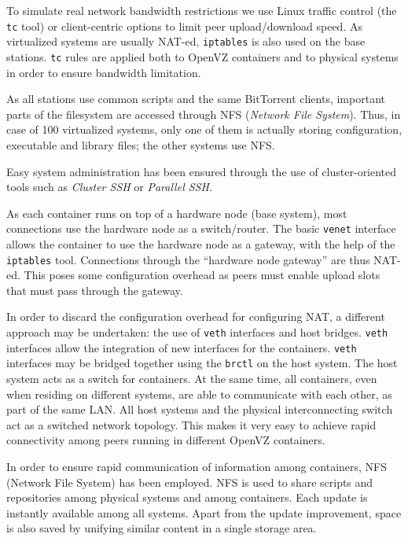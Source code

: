 To simulate real network bandwidth restrictions we use Linux traffic control
(the \texttt{tc} tool) or client-centric options to limit peer upload/download
speed. As virtualized systems are usually NAT-ed, \texttt{iptables} is also
used on the base stations. \texttt{tc} rules are applied both to OpenVZ
containers and to physical systems in order to ensure bandwidth limitation.

As all stations use common scripts and the same BitTorrent clients, important
parts of the filesystem are accessed through NFS (\textit{Network File
System}). Thus, in case of 100 virtualized systems, only one of them is
actually storing configuration, executable and library files; the other
systems use NFS.

Easy system administration has been ensured through the use of
cluster-oriented tools such as \textit{Cluster SSH} or \textit{Parallel SSH}.

As each container runs on top of a hardware node (base system), most
connections use the hardware node as a switch/router. The basic \texttt{venet}
interface allows the container to use the hardware node as a gateway, with the
help of the \texttt{iptables} tool. Connections through the ``hardware node
gateway'' are thus NAT-ed. This poses some configuration overhead as peers
must enable upload slots that must pass through the gateway.

In order to discard the configuration overhead for configuring NAT, a
different approach may be undertaken: the use of \texttt{veth} interfaces and
host bridges. \texttt{veth} interfaces allow the integration of new interfaces
for the containers. \texttt{veth} interfaces may be bridged together using the
\texttt{brctl} on the host system. The host system acts as a switch for
containers. At the same time, all containers, even when residing on different
systems, are able to communicate with each other, as part of the same LAN. All
host systems and the physical interconnecting switch act as a switched network
topology. This makes it very easy to achieve rapid connectivity among peers
running in different OpenVZ containers.

In order to ensure rapid communication of information among containers, NFS
(Network File System) has been employed. NFS is used to share scripts and
repositories among physical systems and among containers. Each update is
instantly available among all systems. Apart from the update improvement,
space is also saved by unifying similar content in a single storage area.

